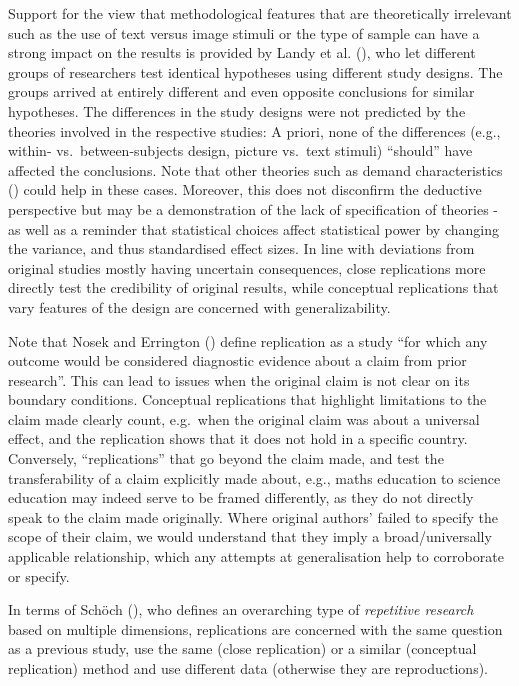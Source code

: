 \documentclass[
  letterpaper,
  DIV=11,
  openany,
  fontsize=12pt,
  parskip=half,
  headings=big,
  numbers=noenddot,
  titlepage=false]{scrreprt}
\begin{document}
Support for the view that methodological features that are theoretically
irrelevant such as the use of text versus image stimuli or the type of
sample can have a strong impact on the results is provided by Landy et
al. (), who let different groups of
researchers test identical hypotheses using different study designs. The
groups arrived at entirely different and even opposite conclusions for
similar hypotheses. The differences in the study designs were not
predicted by the theories involved in the respective studies: A priori,
none of the differences (e.g., within- vs.~between-subjects design,
picture vs.~text stimuli) ``should'' have affected the conclusions. Note
that other theories such as demand characteristics
() could help in these cases.
Moreover, this does not disconfirm the deductive perspective but may be
a demonstration of the lack of specification of theories - as well as a
reminder that statistical choices affect statistical power by changing
the variance, and thus standardised effect sizes. In line with
deviations from original studies mostly having uncertain consequences,
close replications more directly test the credibility of original
results, while conceptual replications that vary features of the design
are concerned with generalizability.

Note that Nosek and Errington ()
define replication as a study ``for which any outcome would be
considered diagnostic evidence about a claim from prior research''. This
can lead to issues when the original claim is not clear on its boundary
conditions. Conceptual replications that highlight limitations to the
claim made clearly count, e.g.~when the original claim was about a
universal effect, and the replication shows that it does not hold in a
specific country. Conversely, ``replications'' that go beyond the claim
made, and test the transferability of a claim explicitly made about,
e.g., maths education to science education may indeed serve to be framed
differently, as they do not directly speak to the claim made originally.
Where original authors' failed to specify the scope of their claim, we
would understand that they imply a broad/universally applicable
relationship, which any attempts at generalisation help to corroborate
or specify.

In terms of Schöch (), who defines an
overarching type of \emph{repetitive research} based on multiple
dimensions, replications are concerned with the same question as a
previous study, use the same (close replication) or a similar
(conceptual replication) method and use different data (otherwise they
are reproductions).
\end{document}

